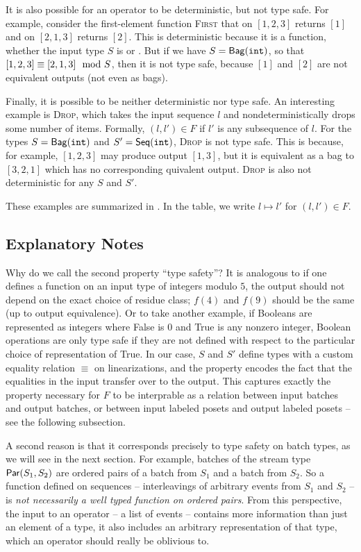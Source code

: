 It is also possible for an operator to be deterministic, but not type safe.
For example, consider the first-element function \textsc{First} that on $[1, 2, 3]$ returns $[1]$ and on $[2, 1, 3]$ returns $[2]$. This is deterministic because it is a function, whether the input type $S$ is \seqint{} or \relint{}. But if we have $S = \mathsf{Bag}({\texttt{int}}){}$, so that $[1, 2, 3] \equiv [2, 1, 3] \mod {S}$, then it is not type safe, because $[1]$ and $[2]$ are not equivalent outputs (not even as bags).

Finally, it is possible to be neither deterministic nor type safe.
An interesting example is \textsc{Drop}, which takes the input sequence $l$ and nondeterministically drops some number of items. Formally, $(l, l') \in F$ if $l'$ is any subsequence of $l$. For the types $S = \mathsf{Bag}({\texttt{int}}){}$ and $S' = \mathsf{Seq}({\texttt{int}}){}$, \textsc{Drop} is not type safe.
This is because, for example, $[1, 2, 3]$ may produce output $[1, 3]$, but it is equivalent as a bag to $[3, 2, 1]$ which has no corresponding quivalent output.
\textsc{Drop} is also not deterministic for any $S$ and $S'$.

These examples are summarized in .
In the table, we write $l \mapsto l'$ for $(l, l') \in F$.

\subsection{Explanatory Notes}

Why do we call the second property ``type safety''? It is analogous to if one defines a function on an input type of integers modulo $5$, the output should not depend on the exact choice of residue class; $f(4)$ and $f(9)$ should be the same (up to output equivalence). Or to take another example, if Booleans are represented as integers where False is $0$ and True is any nonzero integer, Boolean operations are only type safe if they are not defined with respect to the particular choice of representation of True. In our case, $S$ and $S'$ define types with a custom equality relation $\equiv$ on linearizations, and the property encodes the fact that the equalities in the input transfer over to the output. This captures exactly the property necessary for $F$ to be interprable as a relation between input batches and output batches, or between input labeled posets and output labeled posets -- see the following subsection.

A second reason is that it corresponds precisely to type safety on batch types, as we will see in the next section. For example, batches of the stream type $\mathsf{Par}({S_1}, {S_2})$ are ordered pairs of a batch from $S_1$ and a batch from $S_2$. So a function defined on sequences -- interleavings of arbitrary events from $S_1$ and $S_2$ -- is \emph{not necessarily a well typed function on ordered pairs}.
From this perspective, the input to an operator -- a list of events -- contains more information than just an element of a type, it also includes an arbitrary representation of that type, which an operator should really be oblivious to.

